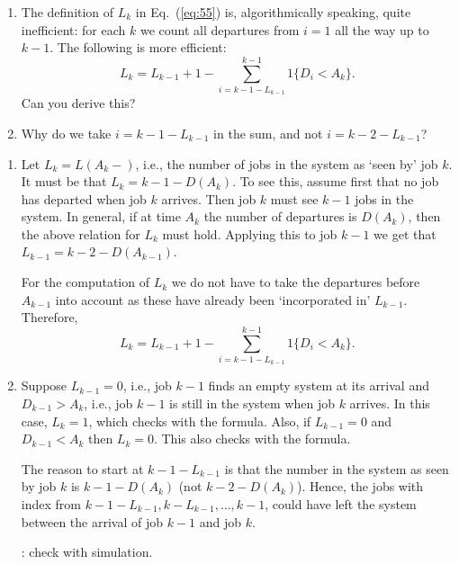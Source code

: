 \begin{question}
  \begin{enumerate}
  \item 
  The definition of $L_k$ in Eq.~(\ref{eq:55}) is, algorithmically
  speaking, quite inefficient: for each $k$ we count all departures
  from $i=1$ all the way up to $k-1$. The following is more efficient: 
  \begin{equation*}
    L_k = L_{k-1}+1 - \sum_{i= k-1 - L_{k-1}}^{k-1} 1\{D_i< A_k\}.
  \end{equation*}
  Can you derive this?
\item Why do we take $i=k-1-L_{k-1}$ in  the sum, and not $i=k-2-L_{k-1}$?
\end{enumerate}
\begin{solution}
  \begin{enumerate}
  \item 
  Let $L_{k} = L(A_{k}-)$, i.e., the number of jobs in the system as
  `seen by' job $k$. It must be that $L_{k}=k-1 - D(A_{k})$. To see
  this, assume first that no job has departed when job $k$
  arrives. Then job $k$ must see $k-1$ jobs in the system. In general,
  if at time $A_k$ the number of departures is $D(A_k)$, then the
  above relation for $L_k$ must hold. Applying this to job $k-1$ we get that $L_{k-1} = k-2 - D(A_{k-1})$. 

  For the computation of $L_k$ we do not have to take the departures
  before $A_{k-1}$ into account as these have already been
  `incorporated in' $L_{k-1}$.  Therefore,
  \begin{equation*}
    L_k = L_{k-1} + 1 - \sum_{i= k-1 - L_{k-1}}^{k-1} 1\{D_i< A_k\}.
  \end{equation*}
\item 
    Suppose $L_{k-1}=0$, i.e., job $k-1$ finds an empty system at its
    arrival and $D_{k-1}>A_{k}$, i.e., job $k-1$ is still in the
    system when job $k$ arrives. In this case, $L_{k}=1$, which checks
    with the formula.  Also, if $L_{k-1}=0$ and $D_{k-1}< A_k$ then
    $L_k = 0$. This also checks with the formula. 

    The reason to start at $k-1-L_{k-1}$ is that the number in the
    system as seen by job $k$ is $k-1 - D(A_k)$ (not
    $k-2-D(A_k)$). Hence, the jobs with index from
    $k-1-L_{k-1}, k-L_{k-1}, \ldots, k-1$, could have left the system
    between the arrival of job $k-1$ and job $k$.

\TBD: check with simulation.
\end{enumerate}
\end{solution}
\end{question}


